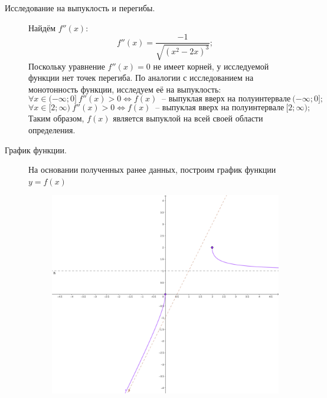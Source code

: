 \documentclass{article}
\begin{document}
\begin{description}
\item[Исследование на выпуклость и перегибы.] Найдём $f''(x)$:
    \begin{equation*}
        f''(x) = \dfrac{-1}{\sqrt{(x^2-2x)^3}};
    \end{equation*}
    Поскольку уравнение $f''(x) = 0$ не имеет корней, у исследуемой функции нет точек перегиба. По аналогии с исследованием на монотонность функции, исследуем её на выпуклость:
    \begin{equation}
        \forall x \in (-\infty;0] ~ f''(x) > 0 \Leftrightarrow f(x) ~ \textrm{ -- выпуклая вверх на полуинтервале} ~ (-\infty;0];
    \end{equation}
    \begin{equation}
        \forall x \in [2;\infty) ~ f''(x) > 0 \Leftrightarrow f(x) ~ \textrm{ -- выпуклая вверх на полуинтервале} ~ [2;\infty);
    \end{equation}
    Таким образом, $f(x)$ является выпуклой на всей своей области определения.
\item[График функции.] На основании полученных ранее данных, построим график функции $y = f(x)$\\
\begin{figure}[h]
\includegraphics[width=\textwidth]{кр_6.png}
\end{figure}
\end{description}


\newpage
\end{document}
